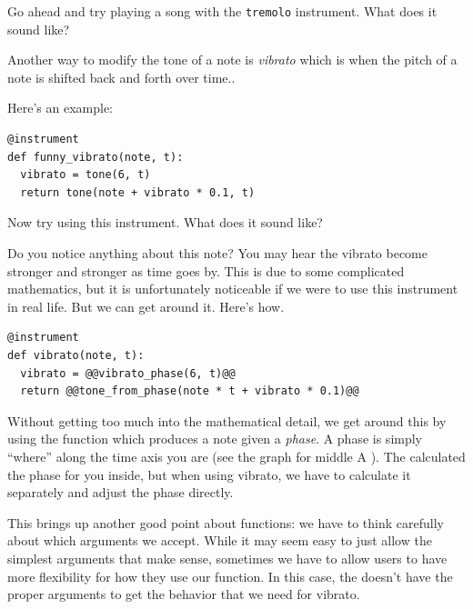 Go ahead and try playing a song with the \texttt{tremolo} instrument. What does it sound like?

Another way to modify the tone of a note is \emph{vibrato} which is
when the pitch of a note is shifted back and forth over
time..

Here's an example:

\begin{TryThisBox}
  \begin{lstlisting}
@instrument
def funny_vibrato(note, t):
  vibrato = tone(6, t)
  return tone(note + vibrato * 0.1, t)
  \end{lstlisting}
\end{TryThisBox}

Now try using this instrument. What does it sound like?

Do you notice anything about this note? You may hear the vibrato become stronger and stronger
as time goes by. This is due to some complicated mathematics, but it is unfortunately noticeable if
we were to use this instrument in real life. But we can get around it. Here's how.

\begin{TryThisBox}
  \begin{lstlisting}
@instrument
def vibrato(note, t):
  vibrato = @@vibrato_phase(6, t)@@
  return @@tone_from_phase(note * t + vibrato * 0.1)@@
  \end{lstlisting}
\end{TryThisBox}

Without getting too much into the mathematical detail, we get around this by using the
 function which produces a note given a \emph{phase}. A phase is simply
``where'' along the time axis you are (see the graph for middle A ). The
 calculated the phase for you inside, but when using vibrato, we have to
calculate it separately and adjust the phase directly.

This brings up another good point about functions: we have to think carefully about which arguments
we accept. While it may seem easy to just allow the simplest arguments that make sense, sometimes we
have to allow users to have more flexibility for how they use our function. In this case, the  doesn't have the
proper arguments to get the behavior that we need for vibrato.

